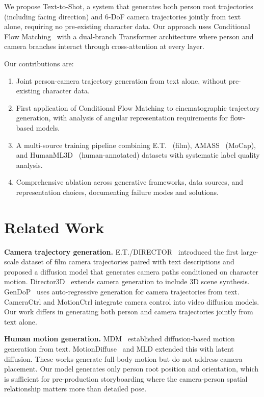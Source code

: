 \documentclass[10pt,twocolumn,letterpaper]{article}
\begin{document}
We propose Text-to-Shot, a system that generates both person root trajectories (including facing direction) and 6-DoF camera trajectories jointly from text alone, requiring no pre-existing character data. Our approach uses Conditional Flow Matching~\cite{lipman2023flow} with a dual-branch Transformer architecture where person and camera branches interact through cross-attention at every layer.

Our contributions are:
\begin{enumerate}
\item Joint person-camera trajectory generation from text alone, without pre-existing character data.
\item First application of Conditional Flow Matching to cinematographic trajectory generation, with analysis of angular representation requirements for flow-based models.
\item A multi-source training pipeline combining E.T.~\cite{courant2024et} (film), AMASS~\cite{mahmood2019amass} (MoCap), and HumanML3D~\cite{guo2022humanml3d} (human-annotated) datasets with systematic label quality analysis.
\item Comprehensive ablation across generative frameworks, data sources, and representation choices, documenting failure modes and solutions.
\end{enumerate}

\section{Related Work}

\textbf{Camera trajectory generation.}
E.T./DIRECTOR~\cite{courant2024et} introduced the first large-scale dataset of film camera trajectories paired with text descriptions and proposed a diffusion model that generates camera paths conditioned on character motion. Director3D~\cite{director3d2024} extends camera generation to include 3D scene synthesis. GenDoP~\cite{gendop2025} uses auto-regressive generation for camera trajectories from text. CameraCtrl and MotionCtrl integrate camera control into video diffusion models. Our work differs in generating both person and camera trajectories jointly from text alone.

\textbf{Human motion generation.}
MDM~\cite{tevet2023human} established diffusion-based motion generation from text. MotionDiffuse~\cite{zhang2022motiondiffuse} and MLD extended this with latent diffusion. These works generate full-body motion but do not address camera placement. Our model generates only person root position and orientation, which is sufficient for pre-production storyboarding where the camera-person spatial relationship matters more than detailed pose.
\end{document}

